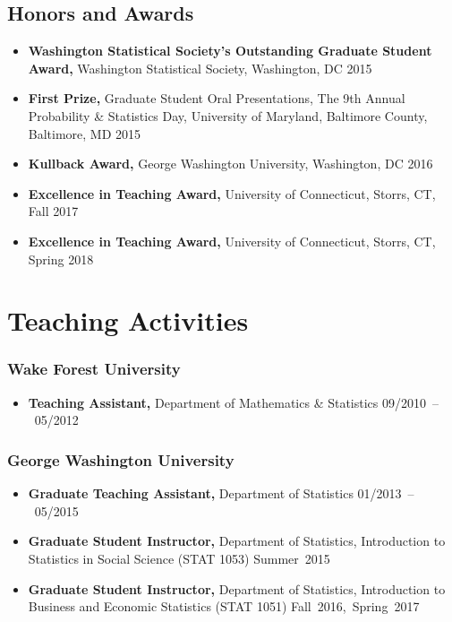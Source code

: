 \documentclass[12pt]{article}
\begin{document}
	\subsection*{Honors and Awards}
	\begin{itemize}
		\item {\bf Washington Statistical Society's Outstanding Graduate 
		Student Award,} Washington Statistical Society, Washington, DC \hfill 
		2015
		\item {\bf First Prize,} Graduate Student Oral Presentations, The 9th 
		Annual Probability \& Statistics Day,  University of Maryland, 
		Baltimore County, Baltimore, MD \hfill 2015
		\item {\bf Kullback Award,} George Washington University, Washington, 
		DC \hfill 2016
		\item {\bf Excellence in Teaching Award,} University of Connecticut, 
		Storrs, CT, \hfill Fall 2017
		\item {\bf Excellence in Teaching Award,} University of Connecticut, 
		Storrs, CT, \hfill Spring 2018
	\end{itemize}
	
	\section*{Teaching Activities}
	
	\subsubsection*{Wake Forest University}
	\begin{itemize}
		\item {\bf Teaching Assistant,} Department of Mathematics \& 
		Statistics \hfill \mbox{09/2010 -- 05/2012}
	\end{itemize}
	
	\subsubsection*{George Washington University}
	\begin{itemize}
		\item {\bf Graduate Teaching Assistant,} Department of 
		Statistics \hfill \mbox{01/2013 -- 05/2015}
		\item {\bf Graduate Student Instructor,} Department of Statistics, 
		Introduction to Statistics in Social Science (STAT 1053) \hfill 
		\mbox{Summer 2015}
		\item {\bf Graduate Student Instructor,} Department of Statistics, 
		Introduction to Business and Economic Statistics (STAT 1051) \hfill 
		\mbox{Fall 2016, Spring 2017}
	\end{itemize}
	
\end{document}
